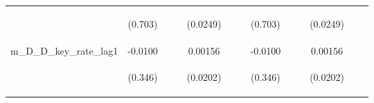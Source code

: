 \documentclass[]{article}
\begin{document}
\begin{center}
\begin{tabular}{lcccccccccccc}
\vspace{4pt} & \begin{footnotesize}(0.703)\end{footnotesize} & \begin{footnotesize}\end{footnotesize} & \begin{footnotesize}\end{footnotesize} & \begin{footnotesize}(0.0249)\end{footnotesize} & \begin{footnotesize}\end{footnotesize} & \begin{footnotesize}\end{footnotesize} & \begin{footnotesize}(0.703)\end{footnotesize} & \begin{footnotesize}\end{footnotesize} & \begin{footnotesize}\end{footnotesize} & \begin{footnotesize}(0.0249)\end{footnotesize} & \begin{footnotesize}\end{footnotesize} & \begin{footnotesize}\end{footnotesize} \\
m\_D\_D\_key\_rate\_lag1 & -0.0100 &  &  & 0.00156 &  &  & -0.0100 &  &  & 0.00156 &  &  \\
\vspace{4pt} & \begin{footnotesize}(0.346)\end{footnotesize} & \begin{footnotesize}\end{footnotesize} & \begin{footnotesize}\end{footnotesize} & \begin{footnotesize}(0.0202)\end{footnotesize} & \begin{footnotesize}\end{footnotesize} & \begin{footnotesize}\end{footnotesize} & \begin{footnotesize}(0.346)\end{footnotesize} & \begin{footnotesize}\end{footnotesize} & \begin{footnotesize}\end{footnotesize} & \begin{footnotesize}(0.0202)\end{footnotesize} & \begin{footnotesize}\end{footnotesize} & \begin{footnotesize}\end{footnotesize} \\

\end{tabular}
\end{center}
\end{document}

